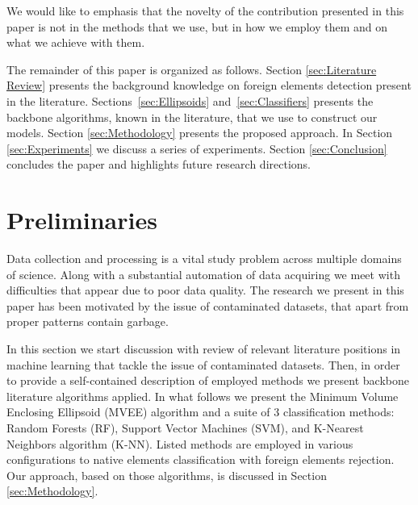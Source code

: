 \documentclass{llncs}
\begin{document}
We would like to emphasis that the novelty of the contribution presented in this paper is not in the methods that we use, but in how we employ them and on what we achieve with them.

The remainder of this paper is organized as follows. Section \ref{sec:Literature Review} presents the background knowledge on foreign elements detection present in the literature. Sections~\ref{sec:Ellipsoids} and~\ref{sec:Classifiers} presents the backbone algorithms, known in the literature, that we use to construct our models. Section \ref{sec:Methodology} presents the proposed approach. In Section \ref{sec:Experiments} we discuss a series of experiments. %
Section \ref{sec:Conclusion} concludes the paper and highlights future research directions.


\vspace{-3pt}
\section{Preliminaries}
  \label{sec:Preliminaries}
\vspace{-6pt}

Data collection and processing is a vital study problem across multiple domains of science. Along with a substantial automation of data acquiring we meet with difficulties that appear due to poor data quality. The research we present in this paper has been motivated by the issue of contaminated datasets, that apart from proper patterns contain garbage.

In this section we start discussion with review of relevant literature positions in machine learning that tackle the issue of contaminated datasets. Then, in order to provide a self-contained description of employed methods we present backbone literature algorithms applied. In what follows we present the Minimum Volume Enclosing Ellipsoid (MVEE) algorithm and a suite of 3 classification methods: Random Forests (RF), Support Vector Machines (SVM), and K-Nearest Neighbors algorithm (K-NN). Listed methods are employed in various configurations to native elements classification with foreign elements rejection. Our approach, based on those algorithms, is discussed in Section \ref{sec:Methodology}.
\end{document}
